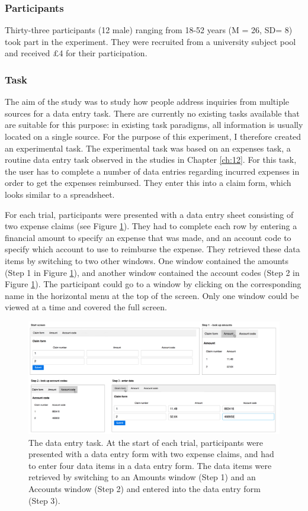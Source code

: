 \subsubsection{Participants}
Thirty-three participants (12 male) ranging from 18-52 years (M = 26, SD= 8) took part in the experiment. They were recruited from a university subject pool and received $\pounds$4 for their participation.

\subsubsection{Task}
The aim of the study was to study how people address inquiries from multiple sources for a data entry task. There are currently no existing tasks available that are suitable for this purpose: in existing task paradigms, all information is usually located on a single source. For the purpose of this experiment, I therefore created an experimental task. The experimental task was based on an expenses task, a routine data entry task observed in the studies in Chapter \ref{ch:12}. For this task, the user has to complete a number of data entries regarding incurred expenses in order to get the expenses reimbursed. They enter this into a claim form, which looks similar to a spreadsheet. 

For each trial, participants were presented with a data entry sheet consisting of two expense claims (see Figure \ref{fig:ch34_4-tasklayout}). They had to complete each row by entering a financial amount to specify an expense that was made, and an account code to specify which account to use to reimburse the expense. They retrieved these data items by switching to two other windows. One window contained the amounts (Step 1 in Figure \ref{fig:ch34_4-tasklayout}), and another window contained the account codes (Step 2 in Figure \ref{fig:ch34_4-tasklayout}). The participant could go to a window by clicking on the corresponding name in the horizontal menu at the top of the screen. Only one window could be viewed at a time and covered the full screen. 

\begin{figure}
 \includegraphics[width=\textwidth]{images/ch34/ch34-4_Tasksequence.pdf}
    \caption{The data entry task. At the start of each trial, participants were presented with a data entry form with two expense claims, and had to enter four data items in a data entry form. The data items were retrieved by switching to an Amounts window (Step 1) and an Accounts window (Step 2) and entered into the data entry form (Step 3).}\label{fig:ch34_4-tasklayout}
\end{figure}

